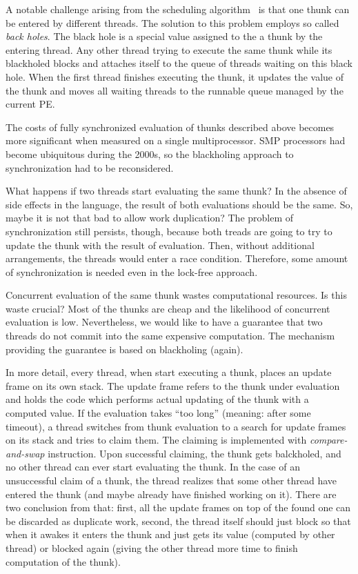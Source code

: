 \documentclass[11pt]{extarticle}
\begin{document}
A notable challenge arising from the scheduling algorithm~\cite{Trinder96} is that one thunk can be entered by different threads. The solution to this problem employs so called \emph{back holes}. The black hole is a special value assigned to the a thunk by the entering thread. Any other thread trying to execute the same thunk while its blackholed blocks and attaches itself to the queue of threads waiting on this black hole. When the first thread finishes executing the thunk, it updates the value of the thunk and moves all waiting threads to the runnable queue managed by the current PE.

The costs of fully synchronized evaluation of thunks described above becomes more significant when measured on a single multiprocessor. SMP processors had become ubiquitous during the 2000s, so the blackholing approach to synchronization had to be reconsidered.

What happens if two threads start evaluating the same thunk? In the absence of side effects in the language, the result of both evaluations should be the same. So, maybe it is not that bad to allow work duplication? The problem of synchronization still persists, though, because both treads are going to try to update the thunk with the result of evaluation. Then, without additional arrangements, the threads would enter a race condition. Therefore, some amount of synchronization is needed even in the lock-free approach.

Concurrent evaluation of the same thunk wastes computational resources. Is this waste crucial? Most of the thunks are cheap and the likelihood of concurrent evaluation is low. Nevertheless, we would like to have a guarantee that two threads do not commit into the same expensive computation. The mechanism providing the guarantee is based on blackholing (again). 

In more detail, every thread, when start executing a thunk, places an update frame on its own stack. The update frame refers to the thunk under evaluation and holds the code which performs actual updating of the thunk with a computed value. If the evaluation takes ``too long'' (meaning: after some timeout), a thread switches from thunk evaluation to a search for update frames on its stack and tries to claim them. The claiming is implemented with \textit{compare-and-swap} instruction. Upon successful claiming, the thunk gets balckholed, and no other thread can ever start evaluating the thunk. In the case of an unsuccessful claim of a thunk, the thread realizes that some other thread have entered the thunk (and maybe already have finished working on it). There are two conclusion from that: first, all the update frames on top of the found one can be discarded as duplicate work, second, the thread itself should just block so that when it awakes it enters the thunk and just gets its value (computed by other thread) or blocked again (giving the other thread more time to finish computation of the thunk).
\end{document}
